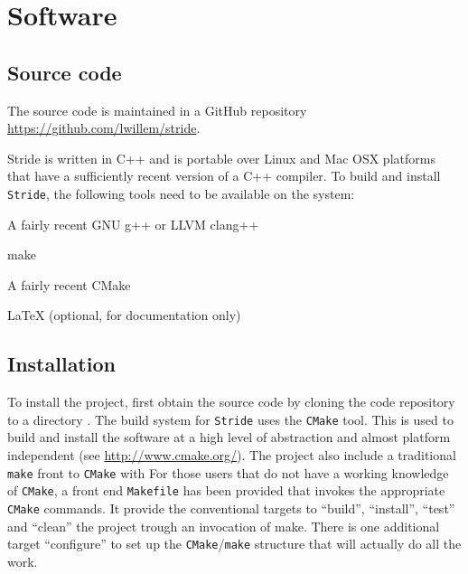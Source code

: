\chapter{Software}
\label{chap:software}


\section{Source code}
\label{section:source}
The source code is maintained in a GitHub repository \url{https://github.com/lwillem/stride}. %

Stride is written in C++ and is portable over Linux and Mac OSX platforms that have a sufficiently recent version of a C++ compiler. To build and install \texttt{Stride}, the following tools need to be available on the system:
\begin{compactitem}
    \item A fairly recent GNU g++ or LLVM clang++
    \item make
    \item A fairly recent CMake
    \item LaTeX (optional, for documentation only)
\end{compactitem}

\section{Installation}
\label{section:Installation}

To install the project, first obtain the source code by cloning the code repository to a directory .
The build system for \texttt{Stride} uses the \texttt{CMake} tool. This is used to build and install the software at a high level of abstraction and almost platform independent (see \url{http://www.cmake.org/}).
The project also include a traditional \texttt{make} front to \texttt{CMake}  with 
For those users that do not have a working knowledge of \texttt{CMake}, a front end \texttt{Makefile} has been provided that invokes the appropriate \texttt{CMake} commands. It provide the conventional targets to ``build'', ``install'', ``test'' and ``clean'' the project trough an invocation of make. There is one additional target ``configure'' to set up the \texttt{CMake}/\texttt{make} structure that will actually do all the work.


